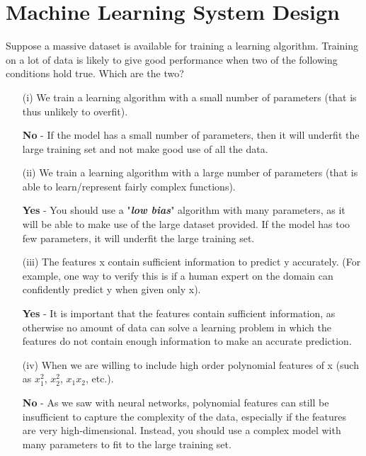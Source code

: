 \documentclass[]{article}
\begin{document}
\section*{Machine Learning System Design}

Suppose a massive dataset is available for training a learning algorithm. Training on a lot of data is likely to give good performance when two of the following conditions hold true. Which are the two?
\begin{itemize}
\item[(i)] We train a learning algorithm with a small number of parameters (that is thus unlikely to overfit).	

\textbf{No} - If the model has a small number of parameters, then it will underfit the large training set and not make good use of all the data.
\item[(ii)] We train a learning algorithm with a large number of parameters (that is able to learn/represent fairly complex functions).	

\textbf{Yes} - You should use a "\textit{\textbf{low bias}}" algorithm with many parameters, as it will be able to make use of the large dataset provided. If the model has too few parameters, it will underfit the large training set.
\item[(iii)] The features x contain sufficient information to predict y accurately. (For example, one way to verify this is if a human expert on the domain can confidently predict y when given only x).	

\textbf{Yes} - It is important that the features contain sufficient information, as otherwise no amount of data can solve a learning problem in which the features do not contain enough information to make an accurate prediction.
\item[(iv)]When we are willing to include high order polynomial features of x (such as $x^2_1$, $x^2_2$, $x_1x_2$, etc.).	

\textbf{No} - As we saw with neural networks, polynomial features can still be insufficient to capture the complexity of the data, especially if the features are very high-dimensional. Instead, you should use a complex model with many parameters to fit to the large training set.

\end{itemize}
\end{document}
